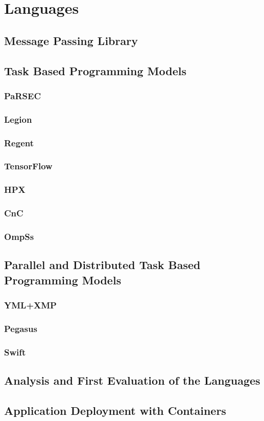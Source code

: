 \chapter{Languages}

\section{Message Passing Library}

\section{Task Based Programming Models}
\subsection{PaRSEC}
\subsection{Legion}
\subsection{Regent}
\subsection{TensorFlow}
\subsection{HPX}
\subsection{CnC}
\subsection{OmpSs}


\section{Parallel and Distributed Task Based Programming Models}
\subsection{YML+XMP}
\subsection{Pegasus}
\subsection{Swift}


\section{Analysis and First Evaluation of the Languages}

\section{Application Deployment with Containers}
